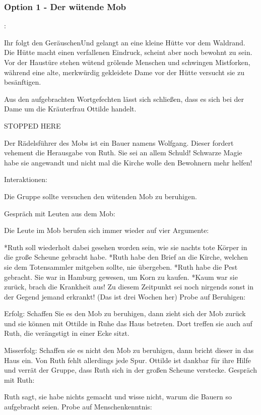 \subsubsection{Option 1 - Der wütende Mob}
\label{mob}

:

Ihr folgt den GeräuschenUnd gelangt an eine kleine Hütte vor dem Waldrand. Die Hütte macht einen verfallenen Eindruck, scheint aber noch bewohnt zu sein. Vor der Haustüre stehen wütend grölende Menschen und schwingen Mistforken, während eine alte, merkwürdig gekleidete Dame vor der Hütte versucht sie zu besänftigen.

Aus den aufgebrachten Wortgefechten lässt sich schließen, dass es sich bei der Dame um die Kräuterfrau Ottilde handelt.

STOPPED HERE



Der Rädelsführer des Mobs ist ein Bauer namens Wolfgang. Dieser fordert vehement die Herausgabe von Ruth. Sie sei an allem Schuld! Schwarze Magie habe sie angewandt und nicht mal die Kirche wolle den Bewohnern mehr helfen!

Interaktionen:

Die Gruppe sollte versuchen den wütenden Mob zu beruhigen.

Gespräch mit Leuten aus dem Mob:

Die Leute im Mob berufen sich immer wieder auf vier Argumente:

*Ruth soll wiederholt dabei gesehen worden sein, wie sie nachts tote Körper in die große Scheune gebracht habe.
*Ruth habe den Brief an die Kirche, welchen sie dem Totensammler mitgeben sollte, nie übergeben.
*Ruth habe die Pest gebracht. Sie war in Hamburg gewesen, um Korn zu kaufen.
*Kaum war sie zurück, brach die Krankheit aus! Zu diesem Zeitpunkt sei noch nirgends sonst in der Gegend jemand erkrankt! (Das ist drei Wochen her)
Probe auf Beruhigen:

Erfolg: Schaffen Sie es den Mob zu beruhigen, dann zieht sich der Mob zurück und sie können mit Ottilde in Ruhe das Haus betreten.
Dort treffen sie auch auf Ruth, die verängstigt in
einer Ecke sitzt.

Misserfolg: Schaffen sie es nicht den Mob zu beruhigen, dann bricht dieser in das Haus ein.
Von Ruth fehlt allerdings jede Spur. Ottilde ist dankbar für ihre Hilfe und verrät der Gruppe,
dass Ruth sich in der großen Scheune verstecke.
Gespräch mit Ruth:

Ruth sagt, sie habe nichts gemacht und wisse nicht, warum die Bauern so aufgebracht seien.
Probe auf Menschenkenntnis:

